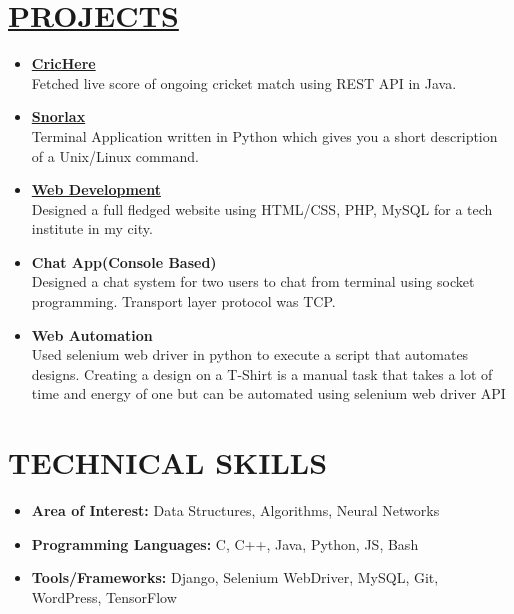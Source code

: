 \documentclass[line, margin, 12pt]{res}
\begin{document}
\begin{resume}
\begin{itemize}
\end{itemize}
\section{\hyperref[https://www.github.com/darshansharma]{PROJECTS}}
\begin{itemize}
\item \textbf{\href{https://github.com/darshansharma/CricHere/blob/master/src/test/Test.java}{CricHere}}\\
Fetched live score of ongoing cricket match using REST API in Java.
\item \textbf{\href{https://github.com/darshansharma/snorlax}{Snorlax}}\\
Terminal Application written in Python which gives you a short description of a Unix/Linux command.
\item \textbf{\href{https://web.archive.org/web/20160414063537/http://www.compuhelpindia.com:80/}{Web Development}}\\
Designed a full fledged website using HTML/CSS, PHP, MySQL for a tech institute in my city.
\item \textbf{Chat App(Console Based)}\\
Designed a chat system for two users to chat from terminal using socket programming. Transport layer protocol was TCP.
\item \textbf{Web Automation} \\
Used selenium web driver in python to execute a script that automates designs.
Creating a design on a T-Shirt is a manual task that takes a lot of time and energy of one but can be automated using selenium web driver API\\
\end{itemize}

\section{TECHNICAL SKILLS}
\begin{itemize}
\item \textbf{Area of Interest:} Data Structures, Algorithms, Neural Networks
\item \textbf{Programming Languages:} C, C++, Java, Python, JS, Bash
\item \textbf{Tools/Frameworks:} Django, Selenium WebDriver, MySQL, Git, WordPress, TensorFlow\\
\end{itemize}

\end{resume}
\end{document}
